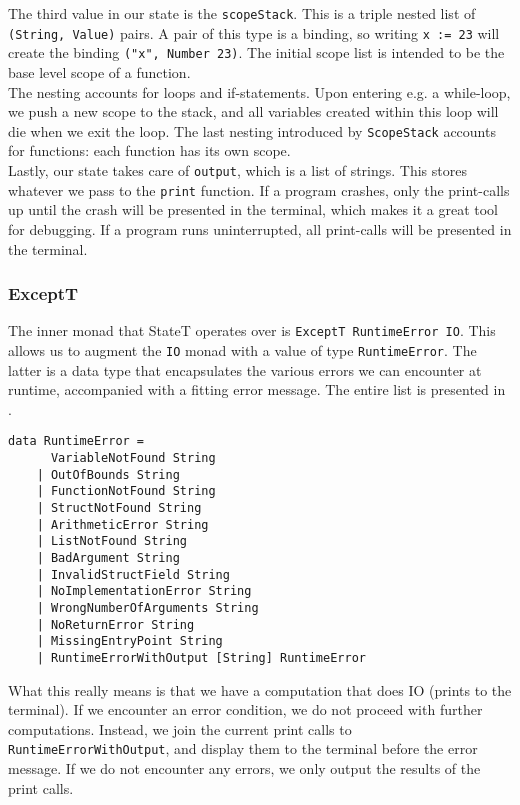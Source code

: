 The third value in our state is the \texttt{scopeStack}. This is a triple nested list of \texttt{(String, Value)} pairs. A pair of this type is a binding, so writing \texttt{x := 23} will create the binding \texttt{("x", Number 23)}. The initial scope list is intended to be the base level scope of a function. \\

The nesting accounts for loops and if-statements. Upon entering e.g. a while-loop, we push a new scope to the stack, and all variables created within this loop will die when we exit the loop. The last nesting introduced by \texttt{ScopeStack} accounts for functions: each function has its own scope. \\

Lastly, our state takes care of \texttt{output}, which is a list of strings. This stores whatever we pass to the \texttt{print} function. If a program crashes, only the print-calls up until the crash will be presented in the terminal, which makes it a great tool for debugging. If a program runs uninterrupted, all print-calls will be presented in the terminal.

\subsubsection{ExceptT}

The inner monad that StateT operates over is \texttt{ExceptT RuntimeError IO}. This allows us to augment the \texttt{IO} monad with a value of type \texttt{RuntimeError}. The latter is a data type that encapsulates the various errors we can encounter at runtime, accompanied with a fitting error message. The entire list is presented in . \\

\begin{lstlisting}[caption={All error messages we can encounter in Psnodig.}, captionpos=b, label={psnodigErrorMsgs}]
data RuntimeError =
      VariableNotFound String
    | OutOfBounds String
    | FunctionNotFound String
    | StructNotFound String
    | ArithmeticError String
    | ListNotFound String
    | BadArgument String
    | InvalidStructField String
    | NoImplementationError String
    | WrongNumberOfArguments String
    | NoReturnError String
    | MissingEntryPoint String
    | RuntimeErrorWithOutput [String] RuntimeError
\end{lstlisting}

What this really means is that we have a computation that does IO (prints to the terminal). If we encounter an error condition, we do not proceed with further computations. Instead, we join the current print calls to \texttt{RuntimeErrorWithOutput}, and display them to the terminal before the error message. If we do not encounter any errors, we only output the results of the print calls.

